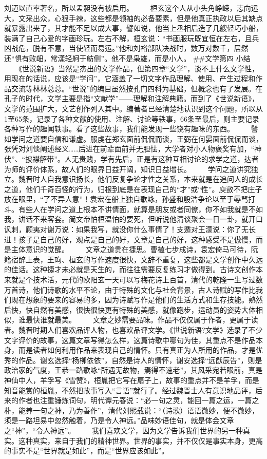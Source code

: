 \documentclass[]{book}
\begin{document}
刘迈以直率著名，所以孟昶没有被启用。
　　桓玄这个人从小头角峥嵘，志向远大，文采出众，心狠手辣，这些都是领袖的必备要素，但是他真正执政以后其缺点就暴露出来了，其才能不足以成大事，譬如说，他当上丞相后造了几艘轻巧小船，装满了自己心爱的字画珍玩。左右不解，桓玄说：``书画服玩既宜恒在左右，且兵凶战危，脱有不意，当使轻而易运。''他和刘裕部队决战时，数万对数千，居然还``惧有败衄，常漾轻舸于舫侧''。他不是枭雄，而是小人。
\#\#文学第四 小结
　　《世说新语》当然是杰出的文学作品，但第四章``文学''，谈不上什么文学性，用现在的话说，应该是``学问''，它涵盖了一切文字作品理解、使用、产生过程和作品交流等林林总总。``世说''的编目虽然按孔门四科为基础，但概念也有了发展。在孔子的时代，文学主要是指``文献学''------理解和注解典籍。而到了《世说新语》，文学的范围扩大，文艺创作列入其中。编著者已经清楚地认识到这个问题，所以从1至65条，记录了各种文献的使用、注解、讨论等轶事，66条至最后，则主要记录各种写作的趣闻轶事。看了这些故事，我们能发现一些饶有趣味的东西。
　　譬如学问之道要自信和谦虚。服虔在郑玄面前侃侃而谈，王弼在何晏面前侃侃而谈，张凭对刘惔阐述经义\ldots{}\ldots{}后进在前辈面前并无胆怯，大学者对小人物褒奖有加，``神伏''、``披襟解带''。人无贵贱，学有先后，正是有这种互相讨论的求学之道，达者为师的评价体系，故人们的眼界日益开阔，知识日益增长。
　　学问之道讲究独立。魏晋时人自我意识扬长，他们反复争论才性之关系，本来就是在追问人的成长之道，他们千奇百怪的行为，归根到底是在表现自己的``才''或``性''。庾敳不把庄子放在眼里，``了不异人意''！袁宏在船上独自歌咏，孙盛和殷浩争论以至于辱骂打斗。有些人在学问之道上根本不讲情面，就算是朋友或者同僚，你不如我就是不如我，讲话不来客套。简文帝怕桓温怕的要死，但听说他清谈聚会一日一卦，就开口讽刺，顾夷对谢万说：如果我写，就没你什么事情了！支遁对王濛说：你了无长进！孩子是自己的好，观点是自己的好，文章是自己的好，这种感受不是傲慢，而是主体意识的觉醒。
　　文章之道贵在捷思。曹植七步成诗，袁宏倚马可待，阮籍宿醉上表，王珣、桓玄的写作速度很快，文辞不重复，这些都是文学创作中久远的佳话。这种捷才未必就是天生的，而往往需要反复练习才做得到。古诗文创作本来就是个技术活，元代的欧阳玄一天可以写梅花诗上百首，清代的乾隆一生写过数万首诗，他们诗歌的水平不论，由于特殊的文化与社会背景，古人诗赋的写作比我们现在想象的要来的容易的多，因为诗赋写作是他们的生活方式和生存技能。熟然后快，快自然有美感，很快很快更有特殊的美感，就像跑步，运动员的姿势大体相似，谁最快谁就最美。
　　文章之妙需要品味。作品不仅仅属于作者，更属于读者。魏晋时期人们喜欢品评人物，也喜欢品评文学。《世说新语?文学》选录了不少文字评价的故事，这篇文章写得怎么样，这篇诗歌中哪句为佳，其重点不是作品本身，而是读者如何利用作品来表现自己的情怀。只有真正为人所用的作品，才是优秀的作品。谢玄选择``杨柳依依''，自然是诗人的情怀，谢安选择``远猷辰告''，则是政治家的气度，王恭一路歌咏``所遇无故物，焉得不速老''，其风采宛若眼前，真是神仙中人，羊孚写《雪赞》，桓胤把它写在扇子上，故事的重点并不是羊孚，而是知音能赏的桓胤，不然把故事写入``言语''就行了。经过魏晋士人有意识地品评，后来的作者也注重锤炼词句，明代谭元春说：``必一句之灵，能回一篇之运，一篇之朴，能养一句之神，乃为善作''，清代刘熙载说：``（诗歌）语语微妙，便不微妙，须是一路坦易中忽然触着，乃是令人神远。''品味妙语佳句，就是体会文章之``神''，``令人神远''。
　　我们喜欢文学，因为文学告诉我们世界的另一种真实。这种真实，来自于我们的精神世界。世界的事实，并不仅仅是事实本身，更高的事实不是``世界就是如此''，而是``世界应该如此''。
\end{document}
